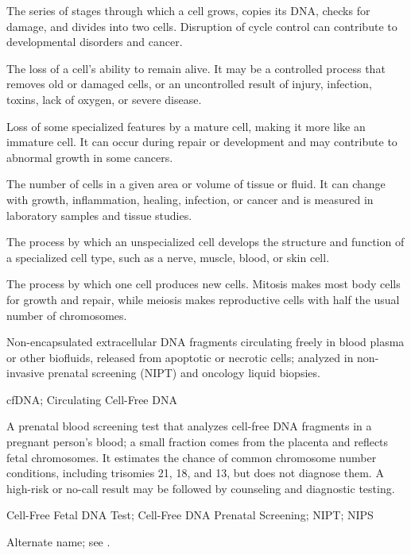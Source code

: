  The series of stages through which a cell grows, copies its DNA, checks for damage, and divides into two cells. Disruption of cycle control can contribute to developmental disorders and cancer.

 The loss of a cell's ability to remain alive. It may be a controlled process that removes old or damaged cells, or an uncontrolled result of injury, infection, toxins, lack of oxygen, or severe disease.

 Loss of some specialized features by a mature cell, making it more like an immature cell. It can occur during repair or development and may contribute to abnormal growth in some cancers.

 The number of cells in a given area or volume of tissue or fluid. It can change with growth, inflammation, healing, infection, or cancer and is measured in laboratory samples and tissue studies.

 The process by which an unspecialized cell develops the structure and function of a specialized cell type, such as a nerve, muscle, blood, or skin cell.

 The process by which one cell produces new cells. Mitosis makes most body cells for growth and repair, while meiosis makes reproductive cells with half the usual number of chromosomes.

 Non-encapsulated extracellular DNA fragments circulating freely in blood plasma or other biofluids, released from apoptotic or necrotic cells; analyzed in non-invasive prenatal screening (NIPT) and oncology liquid biopsies.

\synonyms
cfDNA; Circulating Cell-Free DNA

 A prenatal blood screening test that analyzes
cell-free DNA fragments in a pregnant person's blood; a small fraction comes from the
placenta and reflects fetal chromosomes. It estimates the chance of common chromosome
number conditions, including trisomies 21, 18, and 13, but does not diagnose them. A
high-risk or no-call result may be followed by counseling and diagnostic testing.

\synonyms
Cell-Free Fetal DNA Test; Cell-Free DNA Prenatal Screening; NIPT; NIPS

 Alternate name; see .

